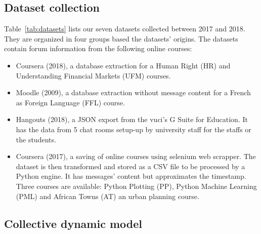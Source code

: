 \documentclass[a4paper,twoside]{article}
\begin{document}
\subsection{Dataset collection}
Table~\ref{tab:datasets} lists our seven datasets collected between 2017 and 2018.  They are organized in four groups based the datasets' origins.
The datasets contain forum information from the following online courses:
\begin{itemize}
\item Coursera (2018), a database extraction for a Human Right (HR) and Understanding Financial Markets (UFM) courses.
\item Moodle (2009), a database extraction without message content for a French as Foreign Language (FFL) course.
\item Hangouts (2018), a JSON export from the \gls{vuci}'s G Suite for Education.  It has the data from 5 chat rooms setup-up by university staff for the staffs or the students.
\item Coursera (2017), a saving of online courses using selenium web scrapper.  The dataset is then transformed and stored as a CSV file to be processed by a Python engine. It has messages' content but approximates the timestamp.  Three courses are available: Python Plotting (PP), Python Machine Learning (PML) and African Towns (AT) an urban planning course.
\end{itemize}

\subsection{Collective dynamic model}
\end{document}
